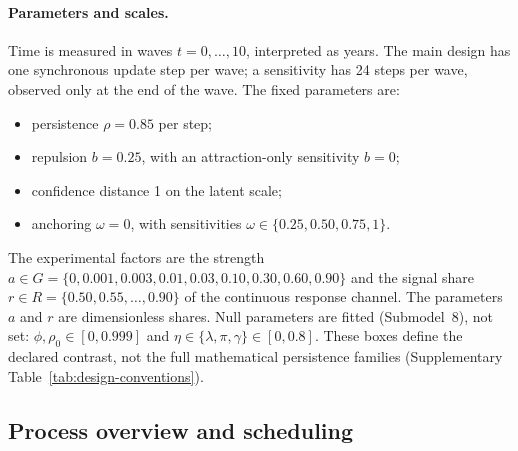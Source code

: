 \paragraph{Parameters and scales.}
Time is measured in waves $t=0,\ldots,10$, interpreted as years. The main design has one synchronous update step per wave; a sensitivity has 24 steps per wave, observed only at the end of the wave. The fixed parameters are:
\begin{itemize}
\item persistence $\rho=0.85$ per step;
\item repulsion $b=0.25$, with an attraction-only sensitivity $b=0$;
\item confidence distance 1 on the latent scale;
\item anchoring $\omega=0$, with sensitivities $\omega\in\{0.25,0.50,0.75,1\}$.
\end{itemize}
The experimental factors are the strength $a\in G=\{0,0.001,0.003,0.01,0.03,0.10,0.30,0.60,0.90\}$ and the signal share $r\in R=\{0.50,0.55,\ldots,0.90\}$ of the continuous response channel. The parameters $a$ and $r$ are dimensionless shares. Null parameters are fitted (Submodel~8), not set: $\phi,\rho_0\in[0,0.999]$ and $\eta\in\{\lambda,\pi,\gamma\}\in[0,0.8]$. These boxes define the declared contrast, not the full mathematical persistence families (Supplementary Table~\ref{tab:design-conventions}).

\subsection{Process overview and scheduling}

